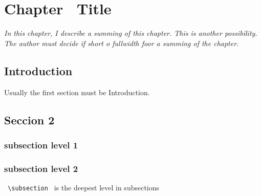 
\chapter{Chapter \thechapter ~Title}
\label{ch:3}
\begin{fullwidth}
\textit{In this chapter, I describe a summing of this chapter. This is another possibility. The author must decide if short o fullwidth foor a summing of the chapter.} \newline
\end{fullwidth}

\section{Introduction}
\label{sec:intro}
Usually the first section must be Introduction.

\section{Seccion 2}
\label{sec:sec}
\subsection{subsection level 1}
\subsection{subsection level 2}

\verb^ \subsection ^ is the deepest level in subsections




